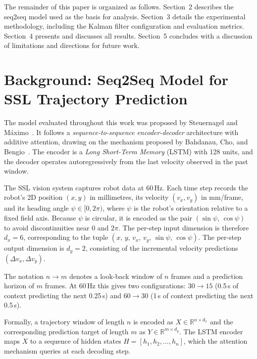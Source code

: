 \documentclass[runningheads]{llncs}
\begin{document}
The remainder of this paper is organized as follows. Section~2 describes the seq2seq model used as the basis for analysis. Section~3 details the experimental methodology, including the Kalman filter configuration and evaluation metrics. Section~4 presents and discusses all results. Section~5 concludes with a discussion of limitations and directions for future work.

\section{Background: Seq2Seq Model for SSL Trajectory Prediction}

The model evaluated throughout this work was proposed by Steuernagel and M\'aximo~\cite{seq2seq}. It follows a \textit{sequence-to-sequence} \textit{encoder-decoder} architecture with additive attention, drawing on the mechanism proposed by Bahdanau, Cho, and Bengio~\cite{bahdanau}. The encoder is a \textit{Long Short-Term Memory} (LSTM) with 128 units, and the decoder operates autoregressively from the last velocity observed in the past window.

The SSL vision system captures robot data at 60\,Hz. Each time step records the robot's 2D position \((x, y)\) in millimetres, its velocity \((v_x, v_y)\) in mm/frame, and its heading angle \(\psi \in [0, 2\pi)\), where \(\psi\) is the robot's orientation relative to a fixed field axis. Because \(\psi\) is circular, it is encoded as the pair \((\sin\psi,\,\cos\psi)\) to avoid discontinuities near \(0\) and \(2\pi\). The per-step input dimension is therefore \(d_x = 6\), corresponding to the tuple \((x,\, y,\, v_x,\, v_y,\, \sin\psi,\, \cos\psi)\). The per-step output dimension is \(d_y = 2\), consisting of the incremental velocity predictions \((\Delta v_x, \Delta v_y)\).

The notation \(n \to m\) denotes a look-back window of \(n\) frames and a prediction horizon of \(m\) frames. At 60\,Hz this gives two configurations: \(30 \to 15\) (0.5\,s of context predicting the next 0.25\,s) and \(60 \to 30\) (1\,s of context predicting the next 0.5\,s).

Formally, a trajectory window of length \(n\) is encoded as \(X \in \mathbb{R}^{n \times d_x}\) and the corresponding prediction target of length \(m\) as \(Y \in \mathbb{R}^{m \times d_y}\). The LSTM encoder maps \(X\) to a sequence of hidden states \(H = [h_1, h_2, \dots, h_n]\), which the attention mechanism queries at each decoding step.
\end{document}
